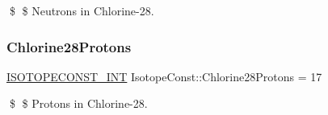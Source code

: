 \$ \$ Neutrons in Chlorine-\/28. \mbox{\label{group___isotope_const-_chlorine-_cl28_gaabaa3b01c821849d011c8598b7d8e89f}} 
\subsubsection{\texorpdfstring{Chlorine28\+Protons}{Chlorine28Protons}}
{\footnotesize\ttfamily \mbox{\hyperlink{group___isotope_const-_macros_ga5f18360b3e99483a35c32d789e62621c}{I\+S\+O\+T\+O\+P\+E\+C\+O\+N\+S\+T\+\_\+\+I\+NT}} Isotope\+Const\+::\+Chlorine28\+Protons = 17}

\$ \$ Protons in Chlorine-\/28. 